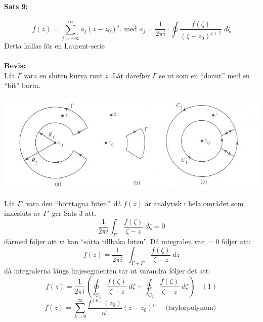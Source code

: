\documentclass{article}%
\begin{document}
\paragraph{Sats 9:}
\[
	f(z) = \sum_{j = - \infty}^\infty a_j (z - z_0)^j. \text{ med } a_j = \frac {1} {2 \pi i} \cdot \ointctrclockwise
		\frac {f(\zeta)} {(\zeta - z_0)^{j + 1}} \; d\zeta
\]
Detta kallas för en Laurent-serie\\
\\
{\bf Bevis:}\\
Låt $\Gamma$ vara en sluten kurva runt $z$.
Låt därefter $\Gamma$ se ut som en ``donut'' med en ``bit'' borta.
\begin{center}
	\includegraphics[scale=0.5]{aoeu.jpg}
\end{center}
Låt $\Gamma'$ vara den ``borttagna biten''. då $f(z)$ är analytisk i hela området som innesluts av $\Gamma'$ ger Sats 3 att.
\[
	\frac {1} {2 \pi i} \int_{\Gamma'} \frac {f(\zeta)} {\zeta - z} \; d\zeta = 0
\]
därmed följer att vi kan ``sätta tillbaka biten''. Då integralen var $= 0$ följer att:
\[
	f(z) = \frac {1} {2 \pi i} \cdot \int_{\Gamma + \Gamma'} \frac {f(\zeta)} {\zeta - z} \; dz
\]
då integralerna längs linjesegmenten tar ut varandra följer det att:
\[
	f(z) = \frac {1} {2 \pi i} \left ( \varointclockwise_{C_1} \frac {f(\zeta)} {\zeta - z} \; d\zeta + 
		\ointctrclockwise_{C_2} \frac {f(\zeta)} {\zeta - z} \; d\zeta \right ) \quad (1)
\]
\[
	f(z) = \sum_{k = 0}^\infty \frac {f^{(n)}(z_0)} {n!} (z - z_0)^n \quad \text{ (taylorpolynom) }
\]
\end{document}
